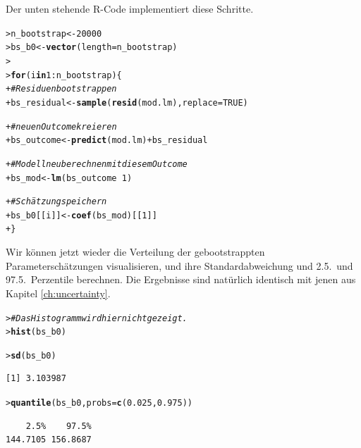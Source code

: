 \documentclass[oneside, 10pt]{book}\usepackage[]{graphicx}\usepackage[]{xcolor}
\makeatletter
\newcommand{\hlnum}[1]{\textcolor[rgb]{0.686,0.059,0.569}{#1}}%
\newcommand{\hlcom}[1]{\textcolor[rgb]{0.678,0.584,0.686}{\textit{#1}}}%
\newcommand{\hlopt}[1]{\textcolor[rgb]{0,0,0}{#1}}%
\newcommand{\hlstd}[1]{\textcolor[rgb]{0.345,0.345,0.345}{#1}}%
\newcommand{\hlkwa}[1]{\textcolor[rgb]{0.161,0.373,0.58}{\textbf{#1}}}%
\newcommand{\hlkwb}[1]{\textcolor[rgb]{0.69,0.353,0.396}{#1}}%
\newcommand{\hlkwc}[1]{\textcolor[rgb]{0.333,0.667,0.333}{#1}}%
\newcommand{\hlkwd}[1]{\textcolor[rgb]{0.737,0.353,0.396}{\textbf{#1}}}%
\newenvironment{kframe}{%
 \def\at@end@of@kframe{}%
 \ifinner\ifhmode%
  \def\at@end@of@kframe{\end{minipage}}%
  \begin{minipage}{\columnwidth}%
 \fi\fi%
 \def\FrameCommand##1{\hskip\@totalleftmargin \hskip-\fboxsep
 \colorbox{shadecolor}{##1}\hskip-\fboxsep
     \hskip-\linewidth \hskip-\@totalleftmargin \hskip\columnwidth}%
 \MakeFramed {\advance\hsize-\width
   \@totalleftmargin\z@ \linewidth\hsize
   \@setminipage}}%
 {\par\unskip\endMakeFramed%
 \at@end@of@kframe}
\newenvironment{knitrout}{}{} %
\makeatother
\begin{document}
Der unten stehende R-Code implementiert diese Schritte.
\begin{knitrout}
\color{fgcolor}\begin{kframe}
\begin{alltt}
\hlstd{> }\hlstd{n_bootstrap} \hlkwb{<-} \hlnum{20000}
\hlstd{> }\hlstd{bs_b0} \hlkwb{<-} \hlkwd{vector}\hlstd{(}\hlkwc{length} \hlstd{= n_bootstrap)}
\hlstd{> }
\hlstd{> }\hlkwa{for} \hlstd{(i} \hlkwa{in} \hlnum{1}\hlopt{:}\hlstd{n_bootstrap) \{}
\hlstd{+ }  \hlcom{# Residuen bootstrappen}
\hlstd{+ }  \hlstd{bs_residual} \hlkwb{<-} \hlkwd{sample}\hlstd{(}\hlkwd{resid}\hlstd{(mod.lm),} \hlkwc{replace} \hlstd{=} \hlnum{TRUE}\hlstd{)}

\hlstd{+ }  \hlcom{# neuen Outcome kreieren}
\hlstd{+ }  \hlstd{bs_outcome} \hlkwb{<-} \hlkwd{predict}\hlstd{(mod.lm)} \hlopt{+} \hlstd{bs_residual}

\hlstd{+ }  \hlcom{# Modell neu berechnen mit diesem Outcome}
\hlstd{+ }  \hlstd{bs_mod} \hlkwb{<-} \hlkwd{lm}\hlstd{(bs_outcome} \hlopt{~} \hlnum{1}\hlstd{)}

\hlstd{+ }  \hlcom{# Schätzung speichern}
\hlstd{+ }  \hlstd{bs_b0[[i]]} \hlkwb{<-} \hlkwd{coef}\hlstd{(bs_mod)[[}\hlnum{1}\hlstd{]]}
\hlstd{+ }\hlstd{\}}
\end{alltt}
\end{kframe}
\end{knitrout}

Wir können jetzt wieder die Verteilung der
gebootstrappten Parameterschätzungen visualisieren,
und ihre Standardabweichung und 2.5.\ und 97.5.\ Perzentile
berechnen. Die Ergebnisse sind natürlich identisch
mit jenen aus Kapitel \ref{ch:uncertainty}.

\begin{knitrout}
\color{fgcolor}\begin{kframe}
\begin{alltt}
\hlstd{> }\hlcom{# Das Histogramm wird hier nicht gezeigt.}
\hlstd{> }\hlkwd{hist}\hlstd{(bs_b0)}
\end{alltt}
\end{kframe}
\end{knitrout}

\begin{knitrout}
\color{fgcolor}\begin{kframe}
\begin{alltt}
\hlstd{> }\hlkwd{sd}\hlstd{(bs_b0)}
\end{alltt}
\begin{verbatim}
[1] 3.103987
\end{verbatim}
\begin{alltt}
\hlstd{> }\hlkwd{quantile}\hlstd{(bs_b0,} \hlkwc{probs} \hlstd{=} \hlkwd{c}\hlstd{(}\hlnum{0.025}\hlstd{,} \hlnum{0.975}\hlstd{))}
\end{alltt}
\begin{verbatim}
    2.5%    97.5% 
144.7105 156.8687 
\end{verbatim}
\end{kframe}
\end{knitrout}
 
\end{document}
